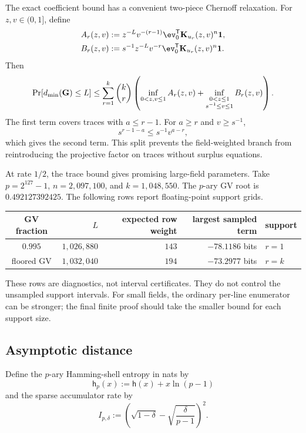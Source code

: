 The exact coefficient bound has a convenient two-piece Chernoff relaxation.
For $z,v\in(0,1]$, define
\begin{align}
 A_r(z,v)
 &:=z^{-L}v^{-(r-1)}
   \ev_0^{\mathsf T}\mathbf K_{u_r}(z,v)^n\boldsymbol 1,
 \label{eq:prime-ea-projective-trace-structural}\\
 B_r(z,v)
 &:=s^{-1}z^{-L}v^{-r}
   \ev_0^{\mathsf T}\mathbf K_{u_r}(z,v)^n\boldsymbol 1.
 \label{eq:prime-ea-projective-trace-field}
\end{align}
Then
\begin{equation}
 \Pr[d_{\min}(\mathbf G)\leq L]
 \leq
 \sum_{r=1}^k\binom{k}{r}
 \left(
  \inf_{0<z,v\leq1}A_r(z,v)
  +\inf_{\substack{0<z\leq1\\s^{-1}\leq v\leq1}}B_r(z,v)
 \right).
 \label{eq:prime-ea-projective-trace-chernoff}
\end{equation}
The first term covers traces with $a\leq r-1$.  For $a\geq r$ and
$v\geq s^{-1}$,
\[
 s^{r-1-a}\leq s^{-1}v^{a-r},
\]
which gives the second term.  This split prevents the field-weighted branch
from reintroducing the projective factor on traces without surplus equations.

At rate $1/2$, the trace bound gives promising large-field parameters.  Take
$p=2^{127}-1$, $n=2{,}097{,}100$, and $k=1{,}048{,}550$.  The $p$-ary GV root
is $0.492127392425$.  The following rows report floating-point support grids.
\begin{center}
\begin{tabular}{c|rrrl}
 GV fraction&$L$&expected row weight&largest sampled term&support\\\hline
 $0.995$&$1{,}026{,}880$&$143$&$-78.1186$ bits&$r=1$\\
 floored GV&$1{,}032{,}040$&$194$&$-73.2977$ bits&$r=k$
\end{tabular}
\end{center}
These rows are diagnostics, not interval certificates.  They do not control
the unsampled support intervals.  For small fields, the ordinary per-line
enumerator can be stronger; the final finite proof should take the smaller
bound for each support size.

\subsection{Asymptotic distance}

Define the $p$-ary Hamming-shell entropy in nats by
\begin{equation}
 \mathsf h_p(x):=\mathsf h(x)+x\ln(p-1)
 \label{eq:prime-shell-entropy}
\end{equation}
and the sparse accumulator rate by
\begin{equation}
 I_{p,\delta}
 :=\left(\sqrt{1-\delta}
          -\sqrt{\frac{\delta}{p-1}}\right)^2.
 \label{eq:prime-ea-sparse-rate}
\end{equation}

